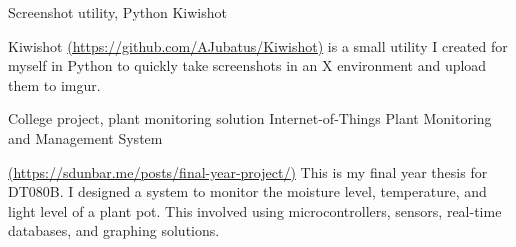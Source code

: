 

\begin{cventries}

%
	\cventry
	{Screenshot utility, Python}
	{Kiwishot}
	{}
	{}
	{
		\begin{cvitems}
		\item {Kiwishot \href{https://github.com/AJubatus/Kiwishot}{(https://github.com/AJubatus/Kiwishot)} is a small utility I created for myself in Python to quickly take screenshots in an X environment and upload them to imgur.}
		\end{cvitems}
		}
	\cventry
	{College project, plant monitoring solution}
	{Internet-of-Things Plant Monitoring and Management System}
	{}
	{}
	{
		\begin{cvitems}
		\item {\href{https://sdunbar.me/posts/final-year-project/t}{(https://sdunbar.me/posts/final-year-project/)} This is my final year thesis for DT080B. I designed a system to monitor the moisture level, temperature, and light level of a plant pot. This involved using microcontrollers, sensors, real-time databases, and graphing solutions.}
		\end{cvitems}
		}

\end{cventries}
